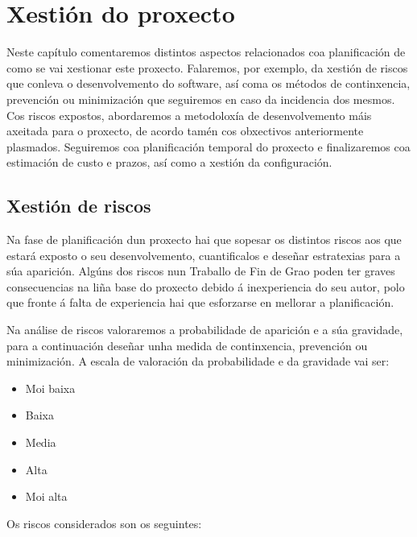 \chapter{Xestión do proxecto}

Neste capítulo comentaremos distintos aspectos relacionados coa planificación de como se vai xestionar este proxecto. Falaremos, por exemplo, da xestión de riscos que conleva o desenvolvemento do software, así coma os métodos de continxencia, prevención ou minimización que seguiremos en caso da incidencia dos mesmos. Cos riscos expostos, abordaremos a metodoloxía de desenvolvemento máis axeitada para o proxecto, de acordo tamén cos obxectivos anteriormente plasmados. Seguiremos coa planificación temporal do proxecto e finalizaremos coa estimación de custo e prazos, así como a xestión da configuración. 

\section{Xestión de riscos}

Na fase de planificación dun proxecto hai que sopesar os distintos riscos aos que estará exposto o seu desenvolvemento, cuantificalos e deseñar estratexias para a súa aparición. Algúns dos riscos nun Traballo de Fin de Grao poden ter graves consecuencias na liña base do proxecto debido á inexperiencia do seu autor, polo que fronte á falta de experiencia hai que esforzarse en mellorar a planificación.

Na análise de riscos valoraremos a probabilidade de aparición e a súa gravidade, para a continuación deseñar unha medida de continxencia, prevención ou minimización. A escala de valoración da probabilidade e da gravidade vai ser:

\begin{itemize}
\item Moi baixa
\item Baixa
\item Media
\item Alta
\item Moi alta
\end{itemize} 

Os riscos considerados son os seguintes:

